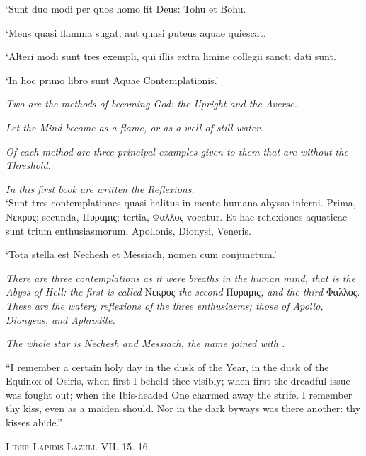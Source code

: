 {
\raggedbottom
{}

{

\begin{sloppypar}
`Sunt duo modi per quos homo fit Deus: Tohu et Bohu.

`Mens quasi flamma sugat, aut quasi puteus aquae quiescat.

`Alteri modi sunt tres exempli, qui illis extra limine collegii sancti dati sunt.

`In hoc primo libro sunt Aquae Contemplationis.'

\textit{Two are the methods of becoming God: the Upright and the Averse.}

\textit{Let the Mind become as a flame, or as a well of still water.}

\textit{Of each method are three principal examples given to them that are without the Threshold.}

\textit{In this first book are written the Reflexions.} \\

`Sunt tres contemplationes quasi halitus in mente humana abysso inferni. Prima, \textgreek{Νεκρος}; secunda, \textgreek{Πυραμις}; tertia, \textgreek{Φαλλος} vocatur. Et hae reflexiones aquaticae sunt trium enthusiasmorum, Apollonis, Dionysi, Veneris.

`Tota stella est Nechesh et Messiach, nomen  cum  conjunctum.'

\textit{There are three contemplations as it were breaths in the human mind, that is the Abyss of Hell: the first is called }\textgreek{Νεκρος}\textit{ the second }\textgreek{Πυραμις}\textit{, and the third }\textgreek{Φαλλος}.\textit{ These are the watery reflexions of the three enthusiasms; those of Apollo, Dionysus, and Aphrodite.}

\textit{The whole star is Nechesh and Messiach, the name  joined with .}
\end{sloppypar}

}
}

\pagebreak
{}




\epigraph{\enquote{I remember a certain holy day in the dusk of the Year, in the dusk of the Equinox of Osiris, when first I beheld thee visibly; when first the dreadful issue was fought out; when the Ibis-headed One charmed away the strife. I remember thy kiss, even as a maiden should. Nor in the dark byways was there another: thy kisses abide.}}{\textsc{Liber Lapidis Lazuli. VII. 15. 16.}}


